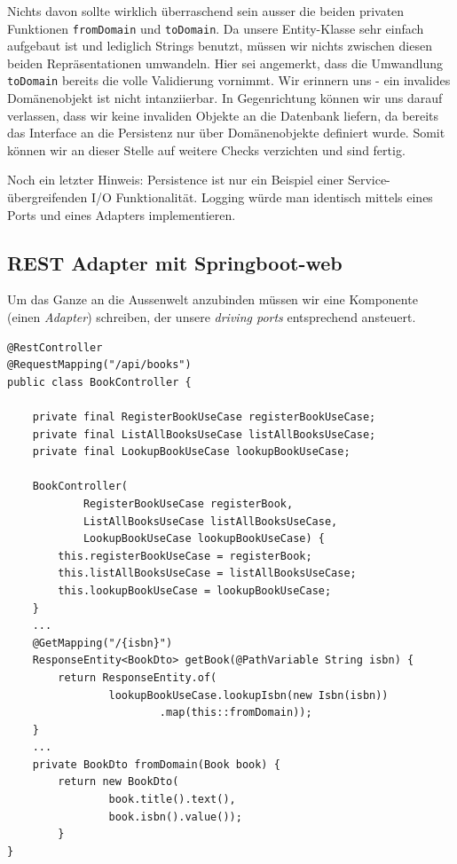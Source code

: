 Nichts davon sollte wirklich überraschend sein ausser die beiden privaten
Funktionen \texttt{fromDomain} und \texttt{toDomain}. Da unsere
Entity-Klasse sehr einfach aufgebaut ist und lediglich Strings
benutzt, müssen wir nichts zwischen diesen beiden Repräsentationen umwandeln.
Hier sei angemerkt, dass die Umwandlung \texttt{toDomain} bereits
die volle Validierung vornimmt. Wir erinnern uns - ein invalides
Domänenobjekt ist nicht intanziierbar. In Gegenrichtung können wir
uns darauf verlassen, dass wir keine invaliden Objekte an die 
Datenbank liefern, da bereits das Interface an die Persistenz
nur über Domänenobjekte definiert wurde. Somit können wir an dieser
Stelle auf weitere Checks verzichten und sind fertig.

Noch ein letzter Hinweis: Persistence ist nur ein Beispiel einer
Service-übergreifenden I/O Funktionalität. Logging würde man identisch
mittels eines Ports und eines Adapters implementieren.

\subsection{REST Adapter mit Springboot-web}

Um das Ganze an die Aussenwelt anzubinden müssen wir eine Komponente 
(einen \textit{Adapter}) schreiben, der unsere \textit{driving ports}
entsprechend ansteuert.

\begin{listing}[H]
\begin{verbatim}
@RestController
@RequestMapping("/api/books")
public class BookController {
    
    private final RegisterBookUseCase registerBookUseCase;
    private final ListAllBooksUseCase listAllBooksUseCase;
    private final LookupBookUseCase lookupBookUseCase;
    
    BookController(
            RegisterBookUseCase registerBook,
            ListAllBooksUseCase listAllBooksUseCase,
            LookupBookUseCase lookupBookUseCase) {
        this.registerBookUseCase = registerBook;
        this.listAllBooksUseCase = listAllBooksUseCase;
        this.lookupBookUseCase = lookupBookUseCase;
    }
    ...
    @GetMapping("/{isbn}")
    ResponseEntity<BookDto> getBook(@PathVariable String isbn) {
        return ResponseEntity.of(
                lookupBookUseCase.lookupIsbn(new Isbn(isbn))
                        .map(this::fromDomain));
    }
    ...
    private BookDto fromDomain(Book book) {
        return new BookDto(
                book.title().text(),
                book.isbn().value());
        }
}
\end{verbatim}
\caption{REST-Adapter implementiert in BookController.java}
\label{lst:BookController}
\end{listing}

